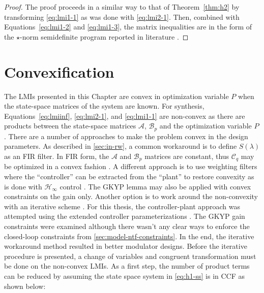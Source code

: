 \begin{proof}
	The proof proceeds in a similar way to that of Theorem~\ref{thm:h2} by transforming \autoref{eq:lmi1-1} as was done with \autoref{eq:lmi2-1}. Then, combined with Equations~\ref{eq:lmi1-2} and \ref{eq:lmi1-3}, the matrix inequalities are in the form of the $\star$-norm semidefinite program reported in literature \cite{Bu2000, Oberoi2005}.
\end{proof}

\section{Convexification}
\label{sec:opt-cvx}

The \gls{LMI}s presented in this Chapter are convex in optimization variable $P$ when the state-space matrices of the system are known. For synthesis, Equations~\ref{eq:lmiinf}, \ref{eq:lmi2-1}, and \ref{eq:lmi1-1} are non-convex as there are products between the state-space matrices $\mathcal{A}$, $\mathcal{B}_p$ and the optimization variable $P$. There are a number of approaches to make the problem convex in the design parameters. As described in \autoref{sec:in-rw}, a common workaround is to define $S(\lambda)$ as an \gls{FIR} filter. In \gls{FIR} form, the $\mathcal{A}$ and $\mathcal{B}_p$ matrices are constant, thus $\mathcal{C}_q$ may be optimized in a convex fashion \cite{Nagahara2012, Tariq2016}. A different approach is to use weighting filters where the ``controller'' can be extracted from the ``plant'' to restore convexity as is done with $\mathcal{H}_\infty$ control \cite{Oberoi2004, Tariq2016}. The \gls{GKYP} lemma may also be applied with convex constraints on the gain only. Another option is to work around the non-convexity with an iterative scheme \cite{Shishkin2017}. For this thesis, the controller-plant approach was attempted using the extended controller parameterizations \cite{DeOliveira2002}. The \gls{GKYP} gain constraints were examined although there wasn't any clear ways to enforce the closed-loop constraints from \autoref{sec:model-ntf-constraints}. In the end, the iterative workaround method resulted in better modulator designs. Before the iterative procedure is presented, a change of variables and congruent transformation must be done on the non-convex \gls{LMI}s. As a first step, the number of product terms can be reduced by assuming the state space system in \autoref{eq:h1-ss} is in \gls{CCF} as shown below:

